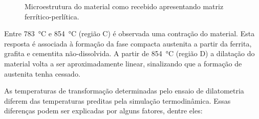 \begin{figure}
  \quad
  \caption{Microestrutura do material como recebido apresentando matriz ferrítico-perlítica.}
  \label{fig:micro_inicial}
\end{figure}

Entre \SI{783}{\degreeCelsius} e \SI{854}{\degreeCelsius} (região C) é observada uma contração do material. Esta resposta é associada à formação da fase compacta austenita a partir da ferrita, grafita e cementita não-dissolvida. A partir de \SI{854}{\degreeCelsius} (região D) a dilatação do material volta a ser aproximadamente linear, sinalizando que a formação de austenita tenha cessado.

As temperaturas de transformação determinadas pelo ensaio de dilatometria diferem das temperaturas preditas pela simulação termodinâmica. Essas diferenças podem ser explicadas por alguns fatores, dentre eles:

